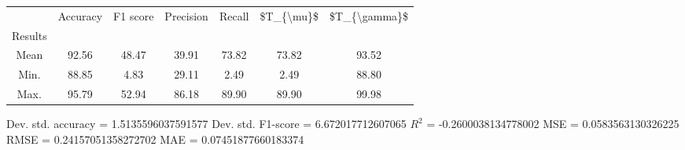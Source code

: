 \begin{tabular}{|c|c|c|c|c|c|c|}
\toprule
{} &  Accuracy &  F1 score &  Precision &  Recall &  \$T\_\{\textbackslash mu\}\$ &  \$T\_\{\textbackslash gamma\}\$ \\
Results &           &           &            &         &            &               \\
\hline
Mean    &     92.56 &     48.47 &      39.91 &   73.82 &      73.82 &         93.52 \\
Min.    &     88.85 &      4.83 &      29.11 &    2.49 &       2.49 &         88.80 \\
Max.    &     95.79 &     52.94 &      86.18 &   89.90 &      89.90 &         99.98 \\
\bottomrule
\end{tabular}

 Dev. std. accuracy = 1.5135596037591577
 Dev. std. F1-score = 6.672017712607065
 $R^2$ = -0.2600038134778002
 MSE = 0.0583563130326225
 RMSE = 0.24157051358272702
 MAE = 0.07451877660183374